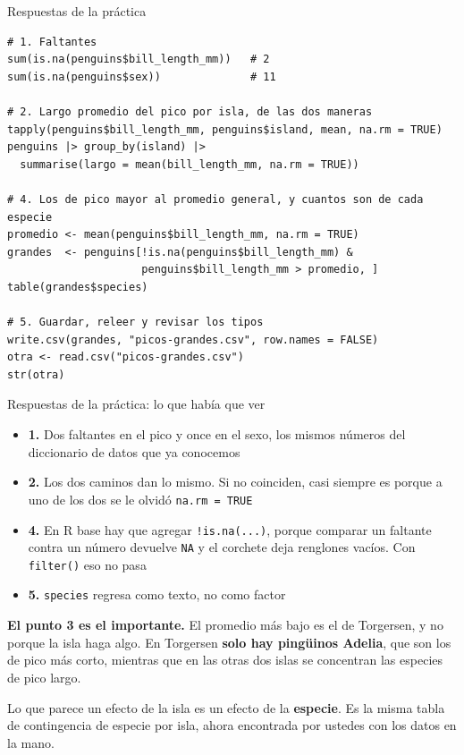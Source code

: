 \documentclass[aspectratio=169,10pt]{beamer}
\newcommand{\Rc}[1]{{\setlength{\fboxsep}{1.6pt}%
  \colorbox{codigoFondo}{\textcolor{codigoTexto}{\texttt{#1}}}}}
\newif\ifrespuestas
\newcommand{\destaca}[1]{%
  \par\vspace{3pt}\noindent
  \colorbox{azulClaro}{%
    \parbox{\dimexpr\linewidth-2\fboxsep\relax}{\vspace{3pt}#1\vspace{3pt}}}%
  \par\vspace{3pt}}
\begin{document}
\ifrespuestas
\begin{frame}[fragile]{Respuestas de la práctica}
\begin{lstlisting}
# 1. Faltantes
sum(is.na(penguins$bill_length_mm))   # 2
sum(is.na(penguins$sex))              # 11

# 2. Largo promedio del pico por isla, de las dos maneras
tapply(penguins$bill_length_mm, penguins$island, mean, na.rm = TRUE)
penguins |> group_by(island) |>
  summarise(largo = mean(bill_length_mm, na.rm = TRUE))

# 4. Los de pico mayor al promedio general, y cuantos son de cada especie
promedio <- mean(penguins$bill_length_mm, na.rm = TRUE)
grandes  <- penguins[!is.na(penguins$bill_length_mm) &
                     penguins$bill_length_mm > promedio, ]
table(grandes$species)

# 5. Guardar, releer y revisar los tipos
write.csv(grandes, "picos-grandes.csv", row.names = FALSE)
otra <- read.csv("picos-grandes.csv")
str(otra)
\end{lstlisting}
\end{frame}
\begin{frame}{Respuestas de la práctica: lo que había que ver}
  \begin{itemize}
    \item \textbf{1.} Dos faltantes en el pico y once en el sexo, los mismos números
      del diccionario de datos que ya conocemos
    \item \textbf{2.} Los dos caminos dan lo mismo. Si no coinciden, casi siempre es
      porque a uno de los dos se le olvidó \Rc{na.rm = TRUE}
    \item \textbf{4.} En R base hay que agregar \Rc{!is.na(...)}, porque comparar un
      faltante contra un número devuelve \Rc{NA} y el corchete deja renglones vacíos.
      Con \Rc{filter()} eso no pasa
    \item \textbf{5.} \texttt{species} regresa como texto, no como factor
  \end{itemize}

  \vspace{0.25cm}
  \destaca{\small \textbf{El punto 3 es el importante.} El promedio más bajo es el de
  Torgersen, y no porque la isla haga algo. En Torgersen \textbf{solo hay pingüinos
  Adelia}, que son los de pico más corto, mientras que en las otras dos islas se
  concentran las especies de pico largo.

  \vspace{0.15cm}
  Lo que parece un efecto de la isla es un efecto de la \textbf{especie}. Es la misma
  tabla de contingencia de especie por isla, ahora encontrada por ustedes con los datos en
  la mano.}
\end{frame}
\end{document}
